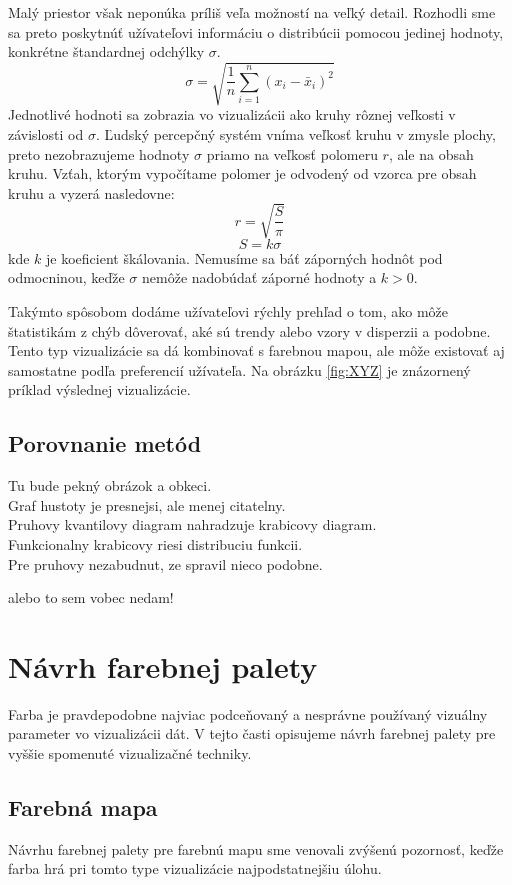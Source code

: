 Malý priestor však neponúka príliš veľa možností na veľký detail. Rozhodli sme sa preto poskytnúť užívateľovi informáciu o distribúcii pomocou jedinej hodnoty, konkrétne štandardnej odchýlky $ \sigma $. 
\[
	\sigma = \sqrt{\frac{1}{n} \sum_{i=1}^{n}(x_{i} - \bar{x}_{i})^2  }
\]
Jednotlivé hodnoti sa zobrazia vo vizualizácii ako kruhy rôznej veľkosti v závislosti od $ \sigma $. Ľudský percepčný systém vníma veľkosť kruhu v zmysle plochy, preto nezobrazujeme hodnoty $ \sigma $ priamo na veľkosť polomeru $ r $, ale na obsah kruhu. Vzťah, ktorým vypočítame polomer je odvodený od vzorca pre obsah kruhu a vyzerá nasledovne:
\[
	r = \sqrt{\frac{S}{\pi}}
\]
\[
	S = k\sigma
\]
kde $ k $ je koeficient škálovania. Nemusíme sa báť záporných hodnôt pod odmocninou, keďže $ \sigma $ nemôže nadobúdať záporné hodnoty a $ k > 0 $.

Takýmto spôsobom dodáme užívateľovi rýchly prehľad o tom, ako môže štatistikám z chýb dôverovať, aké sú trendy alebo vzory v disperzii a podobne. Tento typ vizualizácie sa dá kombinovať s farebnou mapou, ale môže existovať aj samostatne podľa preferencií užívateľa. Na obrázku \ref{fig:XYZ} je znázornený príklad výslednej vizualizácie.

\subsection{Porovnanie metód}

Tu bude pekný obrázok a obkeci. \\
Graf hustoty je presnejsi, ale menej citatelny. \\
Pruhovy kvantilovy diagram nahradzuje krabicovy diagram. \\
Funkcionalny krabicovy riesi distribuciu funkcii. \\

Pre pruhovy nezabudnut, ze \cite{Bade} spravil nieco podobne.

alebo to sem vobec nedam! 

\section{Návrh farebnej palety}
Farba je pravdepodobne najviac podceňovaný a nesprávne používaný vizuálny parameter vo vizualizácii dát. V tejto časti opisujeme návrh farebnej palety pre vyššie spomenuté vizualizačné techniky.

\subsection{Farebná mapa}
Návrhu farebnej palety pre farebnú mapu sme venovali zvýšenú pozornosť, keďže farba hrá pri tomto type vizualizácie najpodstatnejšiu úlohu.

